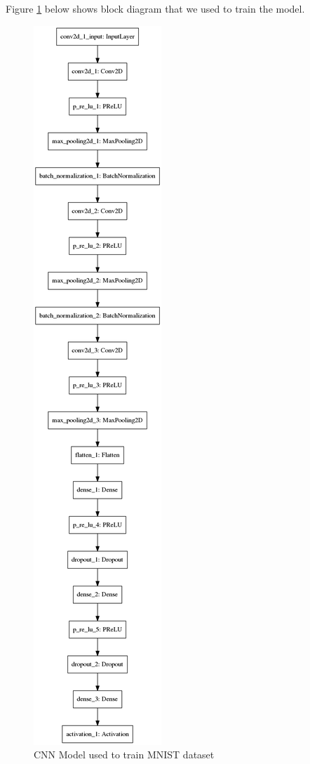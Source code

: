 \documentclass[12pt, letterpaper]{article}
\begin{document}
Figure \ref{model} below shows block diagram that we used to train the 
model. 

\begin{figure}[!h]
	\centering
	\includegraphics[scale = 0.25]{trained_model_diagram.png}
	
	\caption{CNN Model used to train MNIST dataset} \label{model}
\end{figure}
\newpage
\end{document}
